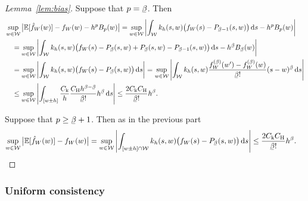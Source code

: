 \begin{proof}[Lemma~\ref{lem:bias}]
  Suppose that $p = \flbeta$.
  Then
  \begin{align*}
    &\sup_{w \in \cW}
    \big|
    \E[\hat f_W(w)]
    - f_W(w)
    - h^p B_p(w)
    \big|
    =
    \sup_{w \in \cW}
    \left|
    \int_{\cW}
    k_h(s,w)
    \big(f_W(s) - P_{\flbeta - 1}(s,w)\big)
    \diff{s}
    - h^p B_p(w)
    \right| \\
    &\quad=
    \sup_{w \in \cW}
    \left|
    \int_{\cW}
    k_h(s,w)
    \big(
    f_W(s) - P_{\flbeta}(s,w)
    + P_{\flbeta}(s,w) - P_{\flbeta - 1}(s,w)
    \big)
    \diff{s}
    - h^{\flbeta} B_{\flbeta}(w)
    \right| \\
    &\quad=
    \sup_{w \in \cW}
    \left|
    \int_{\cW}
    k_h(s,w)
    \big(
    f_W(s) - P_{\flbeta}(s,w)
    \big)
    \diff{s}
    \right|
    =
    \sup_{w \in \cW}
    \left|
    \int_{\cW}
    k_h(s,w)
    \frac{f_W^{(\flbeta)}(w') - f_W^{(\flbeta)}(w)}{\flbeta!}
    (s-w)^{\flbeta}
    \diff{s}
    \right| \\
    &\quad\leq
    \sup_{w \in \cW}
    \left|
    \int_{[w \pm h]}
    \frac{\Ck}{h}
    \frac{\CH h^{\beta - \flbeta}}{\flbeta !}
    h^{\flbeta}
    \diff{s}
    \right|
    \leq
    \frac{2 \Ck \CH}{\flbeta !}
    h^\beta.
  \end{align*}

  Suppose that $p \geq \flbeta+1$.
  Then as in the previous part
  \begin{align*}
    \sup_{w \in \cW}
    \big|
    \E[\hat f_W(w)]
    - f_W(w)
    \big|
    &=
    \sup_{w \in \cW}
    \left|
    \int_{[w \pm h] \cap \cW}
    k_h(s,w)
    \big(
    f_W(s) - P_{\flbeta}(s,w)
    \big)
    \diff{s}
    \right|
    \leq
    \frac{2 \Ck \CH}{\flbeta !}
    h^\beta.
  \end{align*}
\end{proof}

\subsubsection{Uniform consistency}

